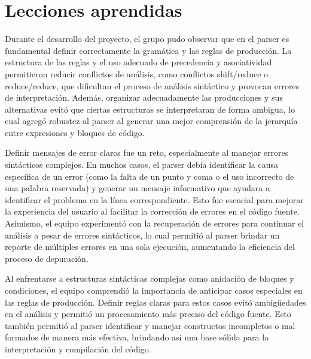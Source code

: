\documentclass[a4paper,12pt]{article}
\begin{document}
\section*{Lecciones aprendidas}
\begin{flushleft}
	\hspace*{2em} Durante el desarrollo del proyecto, el grupo 
pudo observar que en el parser es fundamental definir correctamente 
la gramática y las reglas de producción. La estructura de las reglas 
y el uso adecuado de precedencia y asociatividad permitieron reducir 
conflictos de análisis, como conflictos shift/reduce o reduce/reduce, 
que dificultan el proceso de análisis sintáctico y provocan errores 
de interpretación. Además, organizar adecuadamente las producciones y 
sus alternativas evitó que ciertas estructuras se interpretaran de 
forma ambigua, lo cual agregó robustez al parser al generar una mejor 
comprensión de la jerarquía entre expresiones y bloques de código. \par
\vspace{1em}
\hspace*{2em} Definir mensajes de error claros fue un reto, especialmente 
al manejar errores sintácticos complejos. En muchos casos, el parser debía 
identificar la causa específica de un error (como la falta de un punto y 
coma o el uso incorrecto de una palabra reservada) y generar un mensaje 
informativo que ayudara a identificar el problema en la línea correspondiente. 
Esto fue esencial para mejorar la experiencia del usuario al facilitar la 
corrección de errores en el código fuente. Asimismo, el equipo experimentó 
con la recuperación de errores para continuar el análisis a pesar de 
errores sintácticos, lo cual permitió al parser brindar un reporte de 
múltiples errores en una sola ejecución, aumentando la eficiencia del 
proceso de depuración.\par
\vspace{1em}
\hspace*{2em} Al enfrentarse a estructuras sintácticas complejas como 
anidación de bloques y condiciones, el equipo comprendió la importancia 
de anticipar casos especiales en las reglas de producción. Definir reglas 
claras para estos casos evitó ambigüedades en el análisis y permitió un 
procesamiento más preciso del código fuente. Esto también permitió al parser 
identificar y manejar constructos incompletos o mal formados de manera 
más efectiva, brindando así una base sólida para la interpretación y 
compilación del código.\par
\vspace{1em}

\end{flushleft}
\end{document}
